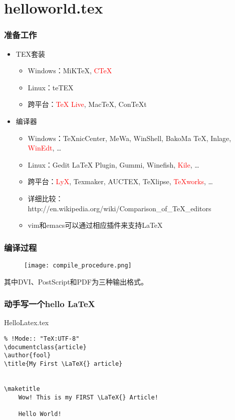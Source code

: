 \section{helloworld.tex}
\begin{frame}\frametitle{准备工作}
    \begin{itemize}
        \item TEX套装
            \begin{itemize}
        		\item Windows：MiKTeX, \textcolor{red}{CTeX}
        		\item Linux：teTEX
        		\item 跨平台：\textcolor{red}{TeX Live}, MacTeX, ConTeXt
        	\end{itemize}
        \item 编译器
            \begin{itemize}
        		\item Windows：TeXnicCenter, MeWa, WinShell, BakoMa TeX, Inlage, \textcolor{red}{WinEdt}, \ldots
        		\item Linux：Gedit LaTeX Plugin, Gummi, Winefish, \textcolor{red}{Kile}, \ldots
        		\item 跨平台：\textcolor{red}{LyX}, Texmaker, AUCTEX, TeXlipse, \textcolor{red}{TeXworks}, \ldots
        		\item 详细比较：\\http://en.wikipedia.org/wiki/Comparison\_of\_TeX\_editors
        		\item vim和emacs可以通过相应插件来支持\LaTeX
        	\end{itemize}
    \end{itemize}
\end{frame}

\begin{frame}\frametitle{编译过程}
    \begin{figure}[t]
        \texttt{[image: compile\_procedure.png]}
    \end{figure}
    \begin{block}{}
        \center
      其中DVI、PostScript和PDF为三种输出格式。
    \end{block}
\end{frame}



\begin{frame}[fragile]
\frametitle{动手写一个hello \LaTeX{}}
    \begin{block}{HelloLatex.tex}
    \begin{verbatim}
% !Mode:: "TeX:UTF-8"
\documentclass{article}
\author{fool}
\title{My First \LaTeX{} article}


\maketitle
    Wow! This is my FIRST \LaTeX{} Article!

    Hello World!

    \end{verbatim}
    \end{block}
\end{frame}

